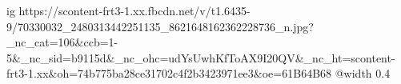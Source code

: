  
 
 
 
 

\ifcmt
  ig https://scontent-frt3-1.xx.fbcdn.net/v/t1.6435-9/70330032_2480313442251135_8621648162362228736_n.jpg?_nc_cat=106&ccb=1-5&_nc_sid=b9115d&_nc_ohc=udYsUwhKfToAX9I20QV&_nc_ht=scontent-frt3-1.xx&oh=74b775ba28ce31702c4f2b3423971ee3&oe=61B64B68
  @width 0.4
\fi
